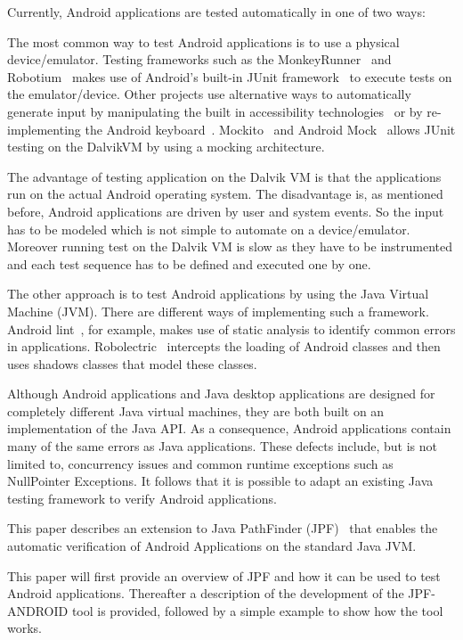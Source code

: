 \documentclass{acm_proc_article-sp}
\begin{document}
Currently, Android applications are tested automatically in one of two ways:

The most common way to test Android applications is to use a physical device/emulator. Testing frameworks such as
the MonkeyRunner~\cite{monkey} and Robotium~\cite{robotium} makes use of Android's built-in JUnit framework~\cite{TestingAndroid} to
execute tests on the emulator/device. Other projects use alternative ways to automatically generate input by manipulating the built in
accessibility technologies~\cite{AccessibilityTech} or by re-implementing the Android keyboard~\cite{KeyboardModel}. Mockito~\cite{mockito}
and Android Mock~\cite{androidMock} allows JUnit testing on the DalvikVM by using a mocking architecture.

The advantage of testing application on the Dalvik VM is that the applications run on the actual Android operating system. The
disadvantage is, as mentioned before, Android applications are driven by user and system events. So the input has to be modeled which is
not simple to automate on a device/emulator. Moreover running test on the Dalvik VM is slow as they have to be instrumented and each test sequence has
to be defined and executed one by one. 
 
The other approach is to test Android applications by using the Java Virtual Machine (JVM). There are different ways of implementing such a
framework. Android
lint~\cite{lint}, for example, makes use of static analysis to identify common errors in applications. Robolectric~\cite{robolectric}
intercepts the loading of Android classes and then uses shadows classes that model these classes.

Although Android applications and Java desktop applications are designed for completely different Java virtual machines, they are both
built on an implementation of the Java API. As a consequence, Android applications contain many of the
same errors as Java applications. These defects include, but is not limited to, concurrency issues and common runtime exceptions such as NullPointer Exceptions. It follows that it
is possible to adapt an existing Java testing framework to verify Android applications.

This paper describes an extension to Java PathFinder (JPF)~\cite{JPFDocs} that enables the automatic
verification of Android Applications on the standard Java JVM. 

This paper will first provide an overview of JPF and how it can be used to test Android applications. Thereafter a description of the
development of the JPF-ANDROID tool is provided, followed by a simple example to show how the tool works.
\end{document}
